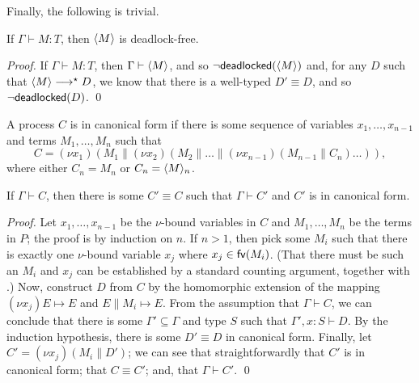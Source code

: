 \documentclass[orivec,envcountsame]{llncs}
\begin{document}
Finally, the following is trivial.

\begin{theorem}\label{thm:typed-terms-df}
  If $\Gamma \vdash M: T$, then $\langle M \rangle$ is deadlock-free.
\end{theorem}

\begin{proof}
  If $\Gamma \vdash M: T$, then $\Gamma \vdash \langle M \rangle$, and so
  $\lnot\mathsf{deadlocked}(\langle M \rangle)$ and, for any $D$ such that $\langle M \rangle \longrightarrow^\star D$, we
  know that there is a well-typed $D' \equiv D$, and so $\lnot\mathsf{deadlocked}(D)$. \qed
\end{proof}

\begin{definition}
A process $C$ is in canonical form if there is some sequence of variables $x_1,\dots,x_{n-1}$ and
terms $M_1,\dots,M_n$ such that
\[
  C = (\nu x_1)(M_1 \parallel (\nu x_2)(M_2 \parallel \dots \parallel (\nu x_{n-1})(M_{n-1} \parallel C_n)\dots)),
\]
where either $C_n = M_n$ or $C_n = \langle M \rangle_n$.
\end{definition}

\begin{lemma}\label{thm:canonical}
  If $\Gamma \vdash C$, then there is some $C' \equiv C$ such that $\Gamma \vdash C'$ and $C'$ is in
  canonical form.
\end{lemma}

\begin{proof}
  Let $x_1,\dots,x_{n-1}$ be the $\nu$-bound variables in $C$ and $M_1,\dots,M_n$ be the terms in
  $P$; the proof is by induction on $n$.  If $n > 1$, then pick some $M_i$ such that there is
  exactly one $\nu$-bound variable $x_j$ where $x_j \in \mathsf{fv}(M_i)$.  (That there must be such an
  $M_i$ and $x_j$ can be established by a standard counting argument, together with
  .)  Now, construct $D$ from $C$ by the homomorphic extension of
  the mapping $(\nu x_j)E \mapsto E$ and $E \parallel M_i \mapsto E$.  From the assumption that
  $\Gamma \vdash C$, we can conclude that there is some $\Gamma' \subseteq \Gamma$ and type $S$ such
  that $\Gamma',x:S \vdash D$.  By the induction hypothesis, there is some $D' \equiv D$ in
  canonical form.  Finally, let $C' = (\nu x_j)(M_i \parallel D')$; we can see that
  straightforwardly that $C'$ is in canonical form; that $C \equiv C'$; and, that $\Gamma \vdash
  C'$. \qed
\end{proof}
\end{document}
